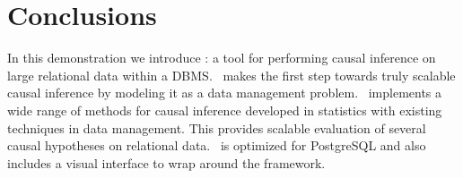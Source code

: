 
\section{Conclusions}
In this demonstration we introduce \GSQL: a tool for
performing causal inference
on large relational data within a DBMS. \GSQL\ makes the first step towards truly scalable causal inference by modeling it as a data management problem. \GSQL\ implements a wide range of methods for causal inference developed in statistics with existing techniques
in data management. This provides scalable evaluation of several causal hypotheses
on relational data. \GSQL\ is optimized for PostgreSQL and also includes a visual interface to wrap around the framework.
